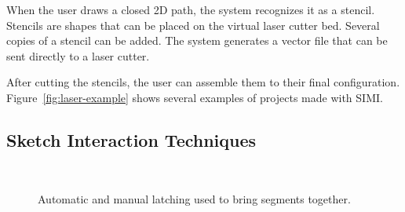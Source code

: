 \documentclass{article}
\begin{document}
When the user draws a closed 2D path, the system recognizes it as a
stencil. Stencils are shapes that can be placed on the virtual laser
cutter bed. Several copies of a stencil can be added. The system
generates a vector file that can be sent directly to a laser cutter.

After cutting the stencils, the user can assemble them to their final
configuration. Figure~\ref{fig:laser-example} shows several examples
of projects made with SIMI.

\subsection{Sketch Interaction Techniques}

\begin{figure}[h]
\centering {}\hspace{5mm}
\\
\hspace{5mm}
\caption{Automatic and manual latching used to bring segments together.}
\label{fig:latch}
\end{figure}
\end{document}
